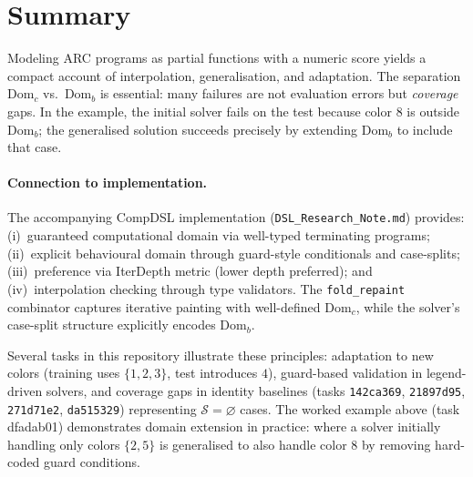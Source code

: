 \documentclass[11pt]{article}
\newcommand{\Domc}{\mathrm{Dom}_c}
\newcommand{\Domb}{\mathrm{Dom}_b}
\begin{document}
\section{Summary}

Modeling ARC programs as partial functions with a numeric score yields a compact account of interpolation, generalisation, and adaptation. The separation $\Domc$ vs.\ $\Domb$ is essential: many failures are not evaluation errors but \emph{coverage} gaps. In the example, the initial solver fails on the test because color $8$ is outside $\Domb$; the generalised solution succeeds precisely by extending $\Domb$ to include that case.

\paragraph{Connection to implementation.} The accompanying CompDSL implementation (\texttt{DSL\_Research\_Note.md}) provides: (i)~guaranteed computational domain via well-typed terminating programs; (ii)~explicit behavioural domain through guard-style conditionals and case-splits; (iii)~preference via IterDepth metric (lower depth preferred); and (iv)~interpolation checking through type validators. The \texttt{fold\_repaint} combinator captures iterative painting with well-defined $\Domc$, while the solver's case-split structure explicitly encodes $\Domb$.

Several tasks in this repository illustrate these principles: adaptation to new colors (training uses $\{1,2,3\}$, test introduces $4$), guard-based validation in legend-driven solvers, and coverage gaps in identity baselines (tasks \texttt{142ca369}, \texttt{21897d95}, \texttt{271d71e2}, \texttt{da515329}) representing $\mathcal{S}=\varnothing$ cases. The worked example above (task dfadab01) demonstrates domain extension in practice: where a solver initially handling only colors $\{2,5\}$ is generalised to also handle color $8$ by removing hard-coded guard conditions.
\end{document}
